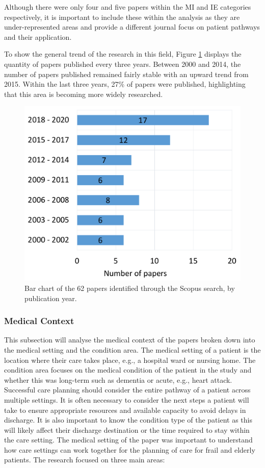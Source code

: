 \documentclass[../thesis.tex]{subfiles}
\begin{document}
Although there were only four and five papers within the MI and IE categories respectively, it is important to include these within the analysis as they are under-represented areas and provide a different journal focus on patient pathways and their application.

To show the general trend of the research in this field, Figure \ref{fig:yearofpaper} displays the quantity of papers published every three years. Between 2000 and 2014, the number of papers published remained fairly stable with an upward trend from 2015. Within the last three years, 27\% of papers were published, highlighting that this area is becoming more widely researched. 

\begin{figure}[H]
\centering
  \includegraphics[scale=0.5]{Chapter2/Figures/Years2.pdf}
  \caption{Bar chart of the 62 papers identified through the Scopus search, by publication year.}
\label{fig:yearofpaper}    
\end{figure}

\subsubsection{Medical Context}
This subsection will analyse the medical context of the papers broken down into the medical setting and the condition area. The medical setting of a patient is the location where their care takes place, e.g., a hospital ward or nursing home. The condition area focuses on the medical condition of the patient in the study and whether this was long-term such as dementia or acute, e.g., heart attack. Successful care planning should consider the entire pathway of a patient across multiple settings. It is often necessary to consider the next steps a patient will take to ensure appropriate resources and available capacity to avoid delays in discharge. It is also important to know the condition type of the patient as this will likely affect their discharge destination or the time required to stay within the care setting. 
 \label{Medical Setting}
The medical setting of the paper was important to understand how care settings can work together for the planning of care for frail and elderly patients. The research focused on three main areas:
\end{document}
